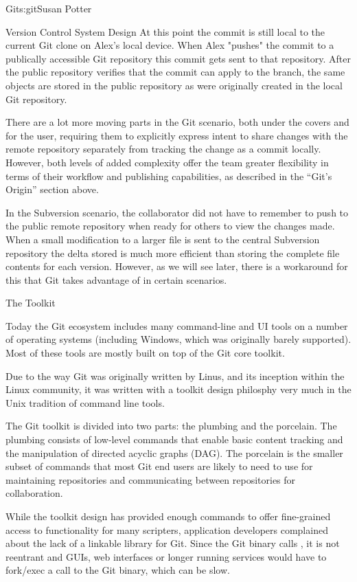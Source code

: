 \begin{aosachapter}{Git}{s:git}{Susan Potter}
\begin{aosasect1}{Version Control System Design}
At this
point the commit is still local to the current Git clone on Alex's
local device. When Alex "pushes" the commit to a publically accessible
Git repository this commit gets sent to that repository. After the public
repository verifies that the commit can apply to the branch, the same objects
are stored in the public repository as were originally created in the
local Git repository.

There are a lot more moving parts in the Git scenario, both under the
covers and for the user, requiring them to explicitly express intent to share
changes with the remote repository separately from tracking the change as a
commit locally. However, both levels of added complexity offer the team
greater flexibility in terms of their
workflow and publishing capabilities, as described in the ``Git's Origin'' section
above.

In the Subversion scenario, the collaborator did not have to remember
to push to the public remote repository when ready for others to
view the changes made. When a small modification to a larger file is sent
to the central Subversion repository the delta stored is much more
efficient than storing the complete file contents for each version.
However, as we will see later, there is a workaround for this that Git
takes advantage of in certain scenarios.

\end{aosasect1}

\begin{aosasect1}{The Toolkit}

Today the Git ecosystem includes many command-line and UI tools on a number
of operating systems (including Windows, which was originally barely
supported). Most of these tools are mostly built on top of the Git core
toolkit.

Due to the way Git was originally written by Linus, and its inception within
the Linux community, it was written with a toolkit design philosphy very much
in the Unix tradition of command line tools.

The Git toolkit is divided into two parts: the plumbing and
the porcelain. The plumbing consists of low-level commands that enable
basic content tracking and
the manipulation of directed acyclic graphs (DAG). The porcelain is 
the smaller subset of  commands that most
Git end users are likely to need to use for maintaining repositories and
communicating between repositories for collaboration.

While the toolkit design has provided enough commands to offer fine-grained
access to functionality for many scripters, application developers
complained about the lack of a linkable library for Git. Since the Git binary
calls , it is not reentrant and GUIs, web interfaces or longer
running services would have to fork/exec a call to the Git binary, which can
be slow.


\end{aosasect1}
\end{aosachapter}
